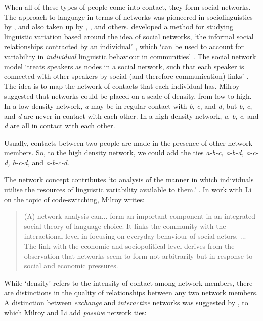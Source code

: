 When all of these types of people come into contact, they form social networks. The approach to language in terms of networks was pioneered in sociolinguistics by \citet{milroy_language_1980}, and also taken up by \citet{le_page_acts_1985}, \citet{ross_social_1997}, and others. \citet{milroy_language_1980} developed a method for studying linguistic variation based around the idea of social networks, \textquoteleft the informal social relationships contracted by an individual' \citep[174]{milroy_language_1980}, which \textquoteleft can be used to account for variability in \textit{individual }linguistic behaviour in communities' \citep[21]{milroy_language_1980}. The social network model \textquoteleft treats speakers as nodes in a social network, such that each speaker is connected with other speakers by social (and therefore communication) links' \citep[213]{ross_social_1997}. The idea is to map the network of contacts that each individual has. Milroy suggested that networks could be placed on a scale of density, from low to high. In a low density network, \textit{a} may be in regular contact with \textit{b}, \textit{c}, and \textit{d}, but \textit{b}, \textit{c}, and \textit{d} are never in contact with each other. In a high density network, \textit{a}, \textit{b}, \textit{c}, and \textit{d} are all in contact with each other.

Usually, contacts between two people are made in the presence of other network members. So, to the high density network, we could add the ties \textit{a-b-c, a-b-d, a-c-d, b-c-d, }and \textit{a-b-c-d}.

The network concept contributes \textquoteleft to analysis of the manner in which individuals utilise the resources of linguistic variability available to them.' \citep[175]{milroy_language_1980}. In work with Li on the topic of code-switching, Milroy writes:

	\begin{quotation} (A) network analysis can... form an important component in an integrated social theory of language choice. It links the community with the interactional level in focusing on everyday behaviour of social actors. ...  The link with the economic and sociopolitical level derives from the observation that networks seem to form not arbitrarily but in response to social and economic pressures. \citep[155]{milroy_social_1995}
	\end{quotation}
	
While \textquoteleft density' refers to the intensity of contact among network members, there are distinctions in the quality of relationships between any two network members. A distinction between \textit{exchange} and \textit{interactive} networks was suggested by \citet{milardo_families_1988}, to which Milroy and Li add \textit{passive} network ties:

